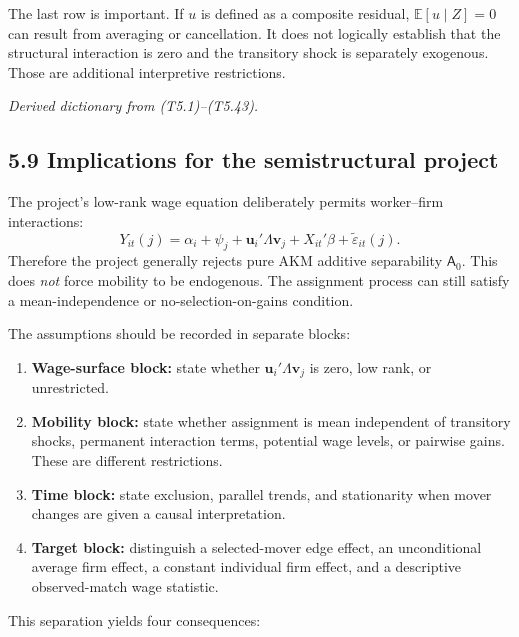 \documentclass[11pt]{article}
\begin{document}
The last row is important.  If \(u\) is defined as a composite residual,
\(\mathbb E[u\mid Z]=0\) can result from averaging or cancellation.  It does
not logically establish that the structural interaction is zero and the
transitory shock is separately exogenous.  Those are additional
interpretive restrictions.

\textit{Derived dictionary from (T5.1)--(T5.43).}

\subsection{5.9 Implications for the semistructural project}

The project's low-rank wage equation deliberately permits
worker--firm interactions:
\[
Y_{it}(j)
=
\alpha_i+\psi_j
+\mathbf u_i'\Lambda\mathbf v_j
+X_{it}'\beta
+\widetilde\varepsilon_{it}(j).
\tag{T5.44}
\]
Therefore the project generally rejects pure AKM additive separability
\(\mathsf A_0\).  This does \emph{not} force mobility to be endogenous.
The assignment process can still satisfy a mean-independence or
no-selection-on-gains condition.

The assumptions should be recorded in separate blocks:

\begin{enumerate}
\item \textbf{Wage-surface block:} state whether
  \(\mathbf u_i'\Lambda\mathbf v_j\) is zero, low rank, or unrestricted.
\item \textbf{Mobility block:} state whether assignment is mean independent
  of transitory shocks, permanent interaction terms, potential wage levels,
  or pairwise gains.  These are different restrictions.
\item \textbf{Time block:} state exclusion, parallel trends, and stationarity
  when mover changes are given a causal interpretation.
\item \textbf{Target block:} distinguish a selected-mover edge effect,
  an unconditional average firm effect, a constant individual firm effect,
  and a descriptive observed-match wage statistic.
\end{enumerate}

This separation yields four consequences:
\end{document}
